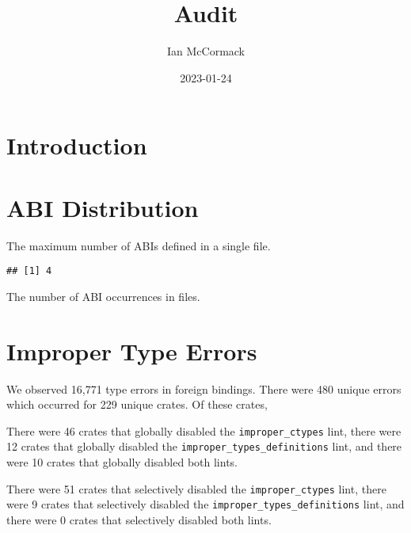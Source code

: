 \documentclass[
]{book}
\title{Audit}
\author{Ian McCormack}
\date{2023-01-24}
\newenvironment{Shaded}{\begin{snugshade}}{\end{snugshade}}
\newcommand{\AttributeTok}[1]{\textcolor[rgb]{0.77,0.63,0.00}{#1}}
\newcommand{\FunctionTok}[1]{\textcolor[rgb]{0.00,0.00,0.00}{#1}}
\newcommand{\NormalTok}[1]{#1}
\newcommand{\OtherTok}[1]{\textcolor[rgb]{0.56,0.35,0.01}{#1}}
\newcommand{\SpecialCharTok}[1]{\textcolor[rgb]{0.00,0.00,0.00}{#1}}
\begin{document}
\maketitle

{
\setcounter{tocdepth}{1}
\tableofcontents
}
\hypertarget{introduction}{%
\chapter{Introduction}\label{introduction}}

\hypertarget{abi-distribution}{%
\chapter{ABI Distribution}\label{abi-distribution}}

The maximum number of ABIs defined in a single file.

\begin{Shaded}
\end{Shaded}

\begin{verbatim}
## [1] 4
\end{verbatim}

The number of ABI occurrences in files.

\hypertarget{improper-type-errors}{%
\chapter{Improper Type Errors}\label{improper-type-errors}}

We observed 16,771 type errors in foreign bindings. There were 480 unique errors which occurred for 229 unique crates. Of these crates,

There were 46 crates that globally disabled the \texttt{improper\_ctypes} lint, there were 12 crates that globally disabled the \texttt{improper\_types\_definitions} lint, and there were 10 crates that globally disabled both lints.

There were 51 crates that selectively disabled the \texttt{improper\_ctypes} lint, there were 9 crates that selectively disabled the \texttt{improper\_types\_definitions} lint, and there were 0 crates that selectively disabled both lints.
\end{document}
